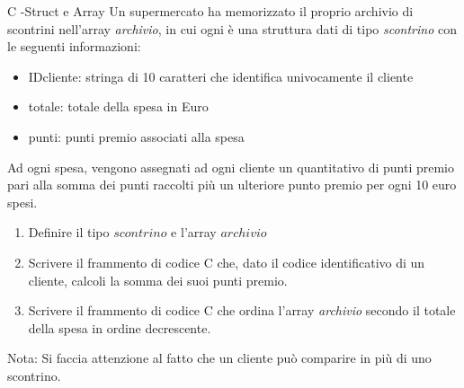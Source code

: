 \documentclass[handout]{beamer}
\begin{document}
\begin{frame}[allowframebreaks]{C -Struct e Array}
Un supermercato ha memorizzato il proprio archivio di scontrini nell'array \emph{archivio}, in cui ogni è una struttura dati di tipo \emph{scontrino} con le  seguenti informazioni:
\begin{itemize}
	\item IDcliente: stringa di 10 caratteri che identifica univocamente il cliente
	\item totale: totale della spesa in Euro
	\item punti: punti premio associati alla spesa
\end{itemize}
Ad ogni spesa, vengono assegnati ad ogni cliente un quantitativo di punti premio pari alla somma dei punti raccolti più un ulteriore punto premio per ogni 10 euro spesi.

\begin{enumerate}
\item  Definire il tipo $scontrino$ e l'array $archivio$
\item Scrivere il frammento di codice C che, dato il codice identificativo di un cliente, calcoli la somma dei suoi punti premio.
\item Scrivere il frammento di codice C che ordina l'array \emph{archivio} secondo il totale della spesa in ordine decrescente.
\end{enumerate}
Nota: Si faccia attenzione al fatto che un cliente può comparire in più di uno scontrino.
\end{frame}
\end{document}
